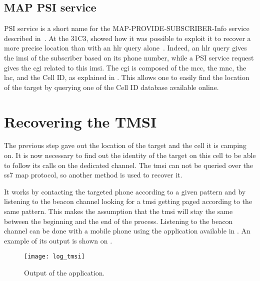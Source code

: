     \subsection{MAP PSI service}

      PSI service is a short name for the MAP-PROVIDE-SUBSCRIBER-Info
      service described in~. At the 31C3,  showed how it was possible to exploit it to recover a more
      precise location than with an \gls{hlr} query
      alone~\cite{nohl_mobile_2014}. Indeed, an \gls{hlr} query gives
      the \gls{imsi} of the subscriber based on its phone number, while
      a PSI service request gives the \gls{cgi} related to this
      \gls{imsi}. The \gls{cgi} is composed of the \gls{mcc}, the
      \gls{mnc}, the \gls{lac}, and the Cell ID, as explained in
      . This allows one to easily find the location of the
      target by querying one of the Cell ID database available online.

    \section{Recovering the TMSI}
    \label{sec:recovering_tmsi}
      
      The previous step gave out the location of the target and the cell
      it is camping on. It is now necessary to find out the identity of
      the target on this cell to be able to follow its calls on the
      dedicated channel. The \gls{tmsi} can not be queried over the
      \gls{ss7} \gls{map} protocol, so another method is used to recover
      it.
      
      It works by contacting the targeted phone according to a given
      pattern and by listening to the beacon channel looking for a
      \gls{tmsi} getting paged according to the same pattern. This makes
      the assumption that the \gls{tmsi} will stay the same between the
      beginning and the end of the process. Listening to the beacon
      channel can be done with a mobile phone using the
       application available in . An
      example of its output is shown on .

      \begin{figure}[h]
        \centering
        \texttt{[image: log\_tmsi]}
      \caption{Output of the  application.}
        \label{fig:log_tmsi}
      \end{figure}

